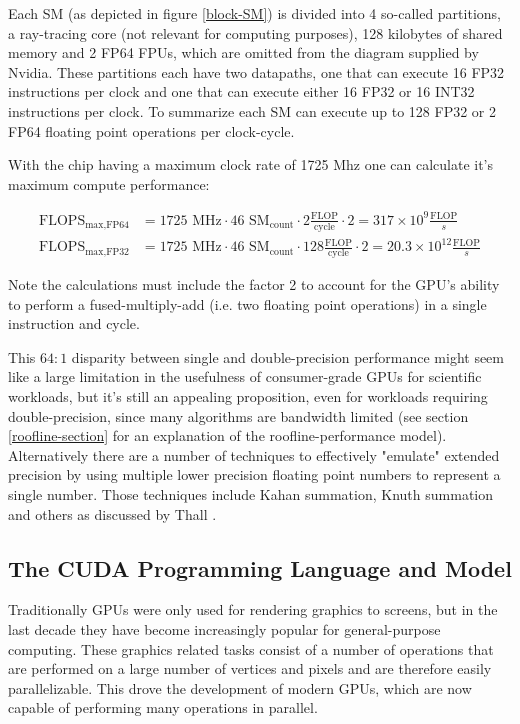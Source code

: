\documentclass[english,11pt,a4paper,table]{article} %
\begin{document}
Each SM (as depicted in figure \ref{block-SM}) is divided into 4 so-called partitions, a ray-tracing core (not relevant for computing purposes), 128 kilobytes of shared memory and 2 FP64 FPUs, which are omitted from the diagram supplied by Nvidia.
These partitions each have two datapaths, one that can execute 16 FP32 instructions per clock and one that can execute either 16 FP32 or 16 INT32 instructions per clock.
To summarize each SM can execute up to 128 FP32 or 2 FP64 floating point operations per clock-cycle.

With the chip having a maximum clock rate of 1725 Mhz one can calculate it's maximum compute performance:

\begin{align*}
	\text{FLOPS}_{\text{max,FP64}} & = 1725 \text{ MHz} \cdot 46 \text{ SM}_{\text{count}} \cdot 2  \frac{\text{FLOP}}{\text{cycle}} \cdot 2 = 317 \times 10^{9}  \frac{\text{FLOP}}{s}     \\
	\text{FLOPS}_{\text{max,FP32}} & = 1725 \text{ MHz} \cdot 46 \text{ SM}_{\text{count}} \cdot 128  \frac{\text{FLOP}}{\text{cycle}} \cdot 2 = 20.3 \times 10^{12}  \frac{\text{FLOP}}{s}
\end{align*}

\label{flop-calculation}
Note the calculations must include the factor 2 to account for the GPU's ability to perform a fused-multiply-add (i.e. two floating point operations) in a single instruction and cycle.

This $64:1$ disparity between single and double-precision performance might seem like a large limitation in the usefulness of consumer-grade GPUs for scientific workloads, but it's still an appealing proposition, even for workloads requiring double-precision, since many algorithms are bandwidth limited (see section \ref{roofline-section} for an explanation of the roofline-performance model).
Alternatively there are a number of techniques to effectively "emulate" extended precision by using multiple lower precision floating point numbers to represent a single number. Those techniques include Kahan summation, Knuth summation and others as discussed by Thall \cite{10.1145/1179622.1179682}.

\subsection{The CUDA Programming Language and Model}

Traditionally GPUs were only used for rendering graphics to screens, but in the last decade they have become increasingly popular for general-purpose computing.
These graphics related tasks consist of a number of operations that are performed on a large number of vertices and pixels and are therefore easily parallelizable.
This drove the development of modern GPUs, which are now capable of performing many operations in parallel.
\end{document}

